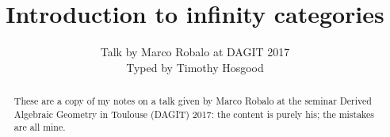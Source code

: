 \documentclass{article}
\title{Introduction to infinity categories}
\author{Talk by Marco Robalo at DAGIT 2017\\Typed by Timothy Hosgood}
\date{\displaydate{date}}
\numberwithin{equation}{subsubsection}
\begin{document}
    \maketitle

    \begin{abstract}
        These are a copy of my notes on a talk given by Marco Robalo at the seminar Derived Algebraic Geometry in Toulouse (DAGIT) 2017: the content is purely his; the mistakes are all mine.
    \end{abstract}
\end{document}
